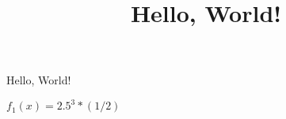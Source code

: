 \documentclass{article}
\title{Hello, World!}
\begin{document}
Hello, World!

$f_1(x) = 2.5^3 * (1/2)$
\end{document}
